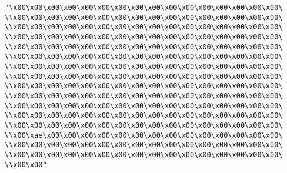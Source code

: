 \verb|"\x00\x00\x00\x00\x00\x00\x00\x00\x00\x00\x00\x00\x00\x00\x00\x00\|\newline
\verb|\\x00\x00\x00\x00\x00\x00\x00\x00\x00\x00\x00\x00\x00\x00\x00\x00\|\newline
\verb|\\x00\x00\x00\x00\x00\x00\x00\x00\x00\x00\x00\x00\x00\x00\x00\x00\|\newline
\verb|\\x00\x00\x00\x00\x00\x00\x00\x00\x00\x00\x00\x00\x00\x00\x00\x00\|\newline
\verb|\\x00\x00\x00\x00\x00\x00\x00\x00\x00\x00\x00\x00\x00\x00\x00\x00\|\newline
\verb|\\x00\x00\x00\x00\x00\x00\x00\x00\x00\x00\x00\x00\x00\x00\x00\x00\|\newline
\verb|\\x00\x00\x00\x00\x00\x00\x00\x00\x00\x00\x00\x00\x00\x00\x00\x00\|\newline
\verb|\\x00\x00\x00\x00\x00\x00\x00\x00\x00\x00\x00\x00\x00\x00\x00\x00\|\newline
\verb|\\x00\x00\x00\x00\x00\x00\x00\x00\x00\x00\x00\x00\x00\x00\x00\x00\|\newline
\verb|\\x00\x00\x00\x00\x00\x00\x00\x00\x00\x00\x00\x00\x00\x00\x00\x00\|\newline
\verb|\\x00\x00\x00\x00\x00\x00\x00\x00\x00\x00\x00\x00\x00\x00\x00\x00\|\newline
\verb|\\x00\x00\x00\x00\x00\x00\x00\x00\x00\x00\x00\x00\x00\x00\x00\x00\|\newline
\verb|\\x00\x00\x00\x00\x00\x00\x00\x00\x00\x00\x00\x00\x00\x00\x00\x00\|\newline
\verb|\\x00\xae\x00\x00\x00\x00\x00\x00\x00\x00\x00\x00\x00\x00\x00\x00\|\newline
\verb|\\x00\x00\x00\x00\x00\x00\x00\x00\x00\x00\x00\x00\x00\x00\x00\x00\|\newline
\verb|\\x00\x00\x00\x00\x00\x00\x00\x00\x00\x00\x00\x00\x00\x00\x00\x00\|\newline
\verb|\\x00\x00"|\newline
